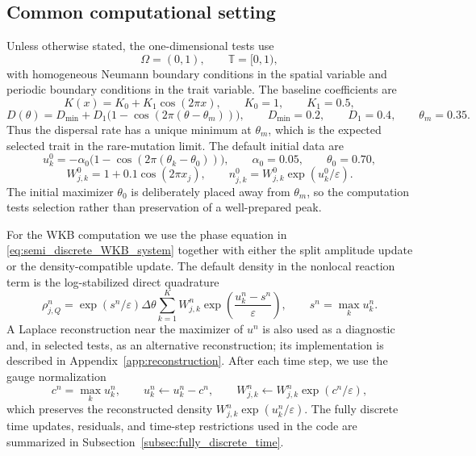 \documentclass[11pt]{article}
\begin{document}
\subsection{Common computational setting}\label{subsec:numerical_common}

Unless otherwise stated, the one-dimensional tests use
\[
    \Omega=(0,1),\qquad \mathbb T=[0,1),
\]
with homogeneous Neumann boundary conditions in the spatial variable and periodic boundary conditions in the trait variable.  The baseline coefficients are
\begin{equation}\label{eq:num_K_baseline_new}
    K(x)=K_0+K_1\cos(2\pi x),
    \qquad K_0=1,
    \qquad K_1=0.5,
\end{equation}
\begin{equation}\label{eq:num_D_baseline_new}
    D(\theta)=D_{\min}+D_1\bigl(1-\cos(2\pi(\theta-\theta_m))\bigr),
    \qquad D_{\min}=0.2,
    \qquad D_1=0.4,
    \qquad \theta_m=0.35.
\end{equation}
Thus the dispersal rate has a unique minimum at \(\theta_m\), which is the expected selected trait in the rare-mutation limit.  The default initial data are
\begin{equation}\label{eq:num_initial_data_new}
    u_k^0=-\alpha_0\bigl(1-\cos(2\pi(\theta_k-\theta_0))\bigr),
    \qquad \alpha_0=0.05,
    \qquad \theta_0=0.70,
\end{equation}
\begin{equation}\label{eq:num_initial_W_new}
    W_{j,k}^0=1+0.1\cos(2\pi x_j),
    \qquad
    n_{j,k}^0=W_{j,k}^0\exp(u_k^0/\varepsilon).
\end{equation}
The initial maximizer \(\theta_0\) is deliberately placed away from \(\theta_m\), so the computation tests selection rather than preservation of a well-prepared peak.

For the WKB computation we use the phase equation in \eqref{eq:semi_discrete_WKB_system} together with either the split amplitude update or the density-compatible update.  The default density in the nonlocal reaction term is the log-stabilized direct quadrature
\begin{equation}\label{eq:log_stable_rho_new}
    \rho_{j,Q}^n
    =\exp(s^n/\varepsilon)\Delta\theta
    \sum_{k=1}^{K} W_{j,k}^n
    \exp\left(\frac{u_k^n-s^n}{\varepsilon}\right),
    \qquad s^n=\max_k u_k^n.
\end{equation}
A Laplace reconstruction near the maximizer of \(u^n\) is also used as a diagnostic and, in selected tests, as an alternative reconstruction; its implementation is described in Appendix~\ref{app:reconstruction}.  After each time step, we use the gauge normalization
\begin{equation}\label{eq:gauge_new}
    c^n=\max_k u_k^n,
    \qquad
    u_k^n\leftarrow u_k^n-c^n,
    \qquad
    W_{j,k}^n\leftarrow W_{j,k}^n\exp(c^n/\varepsilon),
\end{equation}
which preserves the reconstructed density \(W_{j,k}^n\exp(u_k^n/\varepsilon)\). {\color{red} The fully discrete time updates, residuals, and time-step restrictions used in the code are summarized in Subsection~\ref{subsec:fully_discrete_time}.}
\end{document}

